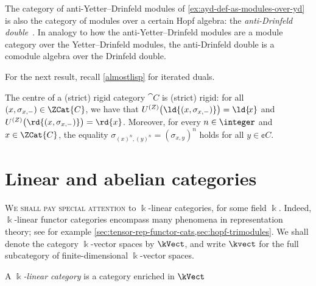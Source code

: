 \begin{remark}\label{rmk:anti-drinfeld-double}
  The category of anti\hyp{}Yetter–Drinfeld modules of \cref{ex:ayd-def-as-modules-over-yd}
  is also the category of modules over a certain Hopf algebra:
  the \emph{anti\hyp{}Drinfeld double}~\cite{caenepeel97:cross-doi-hopf,schauenburg99:examp-doi-koppin-hopf-yetter-drinf}.
  In analogy to how the anti\hyp{}Yetter–Drinfeld modules are a module category over the Yetter–Drinfeld modules,
  the anti\hyp{}Drinfeld double is a comodule algebra over the Drinfeld double.
\end{remark}

For the next result, recall \cref{almostlisp} for iterated duals.

\begin{proposition}\label{prop: rigdity_of_centre}
  The centre of a (strict) rigid category \(\cat{C}\) is (strict) rigid:
  for all \((x, \sigma_{x,-}) \in \ZCat{C}\),
  we have that \(U^{(Z)} \big(\ld{(x, \sigma_{x,-})}\big) = \ld{\!{}x}\)
  and \(U^{(Z)} \big(\rd{(x, \sigma_{x,-})}\big) = \rd{x}\).
  Moreover, for every \(n \in \integer\) and \(x \in \ZCat{C}\),
  the equality \(\sigma_{{(x)}^{n}, {(y)}^{n}} = {(\sigma_{x,y})}^{n}\) holds for all \(y \in \cent{C}\).
\end{proposition}

\section{Linear and abelian categories}\label{sec:linear-ab-cats}

\textsc{We shall pay special attention}
to \(\Bbbk\)\hyp{}linear categories,
for some field \(\Bbbk\).
Indeed, \(\Bbbk\)\hyp{}linear functor categories encompass many phenomena in representation theory;
see for example \cref{sec:tensor-rep-functor-cats,sec:hopf-trimodules}.
We shall denote the category \(\Bbbk\)\hyp{}vector spaces by \(\kVect\),
and write \(\kvect\) for the full subcategory of finite\hyp{}dimensional \(\Bbbk\)\hyp{}vector spaces.

\begin{definition}\label{def:linear-category}
  A \emph{\(\Bbbk\)\hyp{}linear category} is a category enriched in \(\kVect\)
\end{definition}

